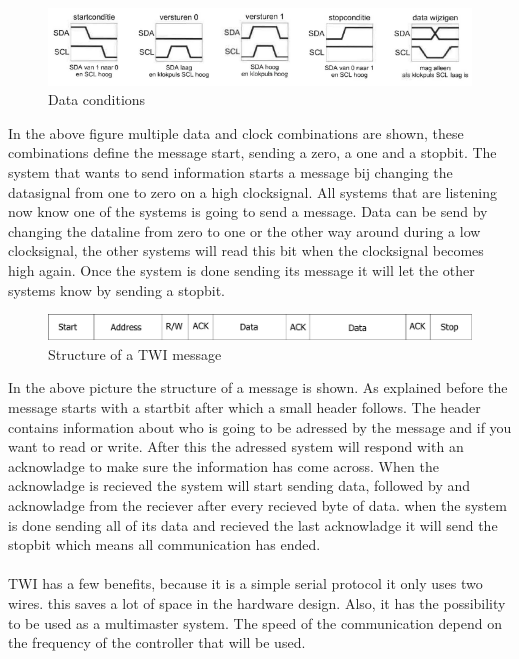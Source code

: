 \documentclass[10pt,a4paper]{article}
\begin{document}
\begin{figure}[H]
        \centering
        \graphicspath{ {./images/} }
        \includegraphics[scale=.6]{datacondities}
        \caption{Data conditions}
        \label{fig:Data conditions}
\end{figure}
In the above figure multiple data and clock combinations are shown, these combinations define the message start, sending a zero, a one and a stopbit. The system that wants to send information starts a message bij changing the datasignal from one to zero on a high clocksignal. All systems that are listening now know one of the systems is going to send a message. Data can be send by changing the dataline from zero to one or the other way around during a low clocksignal, the other systems will read this bit when the clocksignal becomes high again. Once the system is done sending its message it will let the other systems know by sending a stopbit.

\begin{figure}[H]
        \centering
        \graphicspath{ {./images/} }
        \includegraphics[scale=.6]{TWImessage}
        \caption{Structure of a TWI message}
        \label{fig:TWIstructure}
\end{figure}
In the above picture the structure of a message is shown. As explained before the message starts with a startbit after which a small header follows. The header contains information about who is going to be adressed by the message and if you want to read or write. After this the adressed system will respond with an acknowladge to make sure the information has come across. When the acknowladge is recieved the system will start sending data, followed by and acknowladge from the reciever after every recieved byte of data. when the system is done sending all of its data and recieved the last acknowladge it will send the stopbit which means all communication has ended.
\\
\\
TWI has a few benefits, because it is a simple serial protocol it only uses two wires. this saves a lot of space in the hardware design. Also, it has the possibility to be used as a multimaster system.
The speed of the communication depend on the frequency of the controller that will be used.
\end{document}
